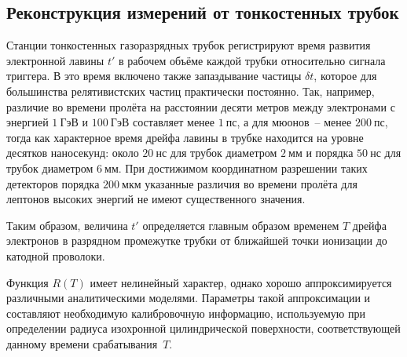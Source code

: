 \subsection{Реконструкция измерений от тонкостенных трубок}

Станции тонкостенных газоразрядных трубок регистрируют время развития
электронной лавины $t'$ в рабочем объёме каждой трубки относительно
сигнала триггера. В это время включено также запаздывание
частицы $\delta t$, которое для большинства релятивистских частиц
практически постоянно. Так, например, различие
во времени пролёта на расстоянии десяти метров между электронами с
энергией $1~\text{ГэВ}$ и $100~\text{ГэВ}$ составляет менее $1~\text{пс}$,
а для мюонов~-- менее $200~\text{пс}$, тогда как характерное время
дрейфа лавины в трубке находится на уровне десятков наносекунд:
около $20~\text{нс}$ для трубок диаметром $2~\text{мм}$ и порядка
$50~\text{нс}$ для трубок диаметром $6~\text{мм}$. При достижимом
координатном разрешении таких детекторов порядка $200~\text{мкм}$
указанные различия во времени пролёта для лептонов высоких энергий
не имеют существенного значения.

Таким образом, величина $t'$ определяется главным образом временем $T$
дрейфа электронов в разрядном промежутке трубки от ближайшей точки
ионизации до катодной проволоки.

Функция $R(T)$ имеет нелинейный характер, однако хорошо аппроксимируется
различными аналитическими моделями. Параметры такой аппроксимации и
составляют необходимую калибровочную информацию, используемую при
определении радиуса изохронной цилиндрической поверхности, соответствующей
данному времени срабатывания~$T$.

